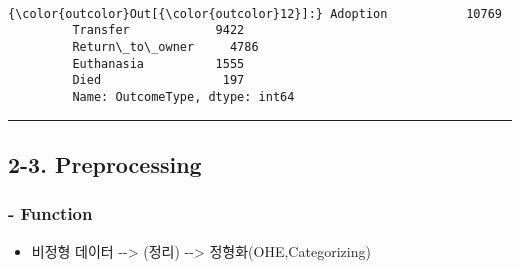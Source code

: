 \documentclass[11pt]{article}
\providecommand{\tightlist}{%
      \setlength{\itemsep}{0pt}\setlength{\parskip}{0pt}}
\begin{document}
    \begin{center}
    \end{center}
    { \hspace*{\fill} \\}
    
\begin{Verbatim}[commandchars=\\\{\}]
{\color{outcolor}Out[{\color{outcolor}12}]:} Adoption           10769
         Transfer            9422
         Return\_to\_owner     4786
         Euthanasia          1555
         Died                 197
         Name: OutcomeType, dtype: int64
\end{Verbatim}
            
    \begin{center}\rule{0.5\linewidth}{\linethickness}\end{center}

\subsection{2-3. Preprocessing}\label{preprocessing}

\subsubsection{- Function}\label{function}

\begin{itemize}
\tightlist
\item
  비정형 데이터 -\/-\textgreater{} (정리) -\/-\textgreater{}
  정형화(OHE,Categorizing)
\end{itemize}
\end{document}
